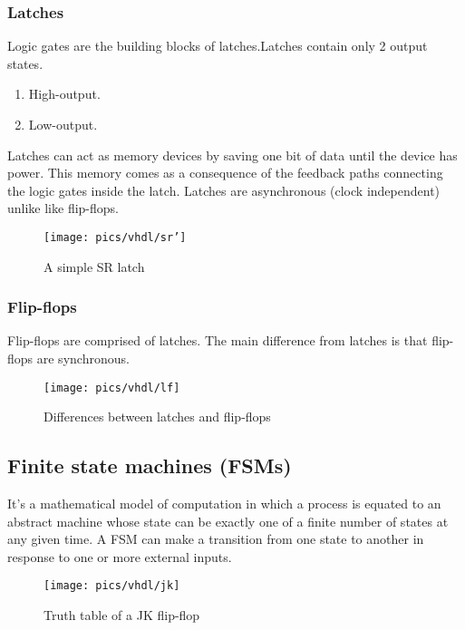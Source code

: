 \subsubsection{Latches }

\noindent
Logic gates are the building blocks of latches.Latches contain only 2 output states.
\begin{enumerate}
	\item High-output.
	\item Low-output.
\end{enumerate}

\noindent
Latches can act as memory devices by saving one bit of data until the device has power. This memory comes as a consequence of the feedback paths connecting the logic gates inside the latch. Latches are asynchronous (clock independent) unlike like flip-flops.

\begin{figure}[!h]
	\centering
	\texttt{[image: pics/vhdl/sr']}
	\caption{A simple SR latch}
	\label{fig:sr}
\end{figure}

\subsubsection{Flip-flops }

Flip-flops are comprised of latches. The main difference from latches is that flip-flops are synchronous. 

\begin{figure}[!h]
	\centering
	\texttt{[image: pics/vhdl/lf]}
	\caption{Differences between latches and flip-flops}
	\label{fig:lf}
\end{figure}

\pagebreak

\subsection{Finite state machines (FSMs)}

\noindent
It's a mathematical model of computation in which a process is equated to an abstract machine whose state can be  exactly one of a finite number of states at any given time. A FSM can make a transition from one state to another in response to one or more external inputs. 

\begin{figure}[!h]
	\centering
	\texttt{[image: pics/vhdl/jk]}
	\caption{Truth table of a JK flip-flop}
	\label{fig:jk}
\end{figure}

